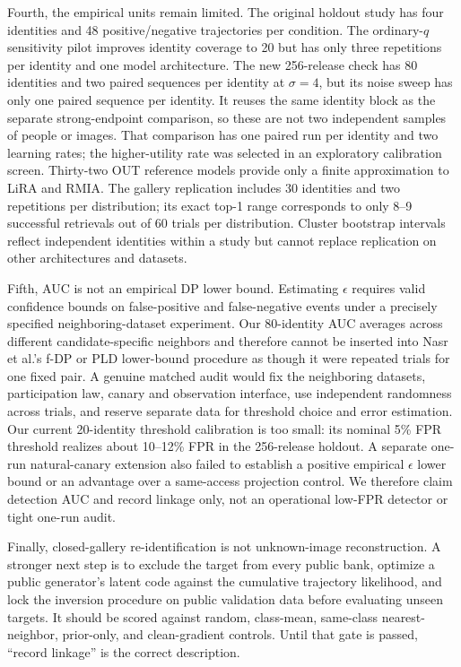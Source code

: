 \documentclass[conference]{IEEEtran}
\begin{document}
Fourth, the empirical units remain limited. The original holdout study has four identities and 48 positive/negative trajectories per condition. The ordinary-$q$ sensitivity pilot improves identity coverage to 20 but has only three repetitions per identity and one model architecture. The new 256-release check has 80 identities and two paired sequences per identity at $\sigma=4$, but its noise sweep has only one paired sequence per identity. It reuses the same identity block as the separate strong-endpoint comparison, so these are not two independent samples of people or images. That comparison has one paired run per identity and two learning rates; the higher-utility rate was selected in an exploratory calibration screen. Thirty-two OUT reference models provide only a finite approximation to LiRA and RMIA. The gallery replication includes 30 identities and two repetitions per distribution; its exact top-1 range corresponds to only 8--9 successful retrievals out of 60 trials per distribution. Cluster bootstrap intervals reflect independent identities within a study but cannot replace replication on other architectures and datasets.

Fifth, AUC is not an empirical DP lower bound. Estimating $\epsilon$ requires valid confidence bounds on false-positive and false-negative events under a precisely specified neighboring-dataset experiment. Our 80-identity AUC averages across different candidate-specific neighbors and therefore cannot be inserted into Nasr et al.'s f-DP or PLD lower-bound procedure as though it were repeated trials for one fixed pair. A genuine matched audit would fix the neighboring datasets, participation law, canary and observation interface, use independent randomness across trials, and reserve separate data for threshold choice and error estimation. Our current 20-identity threshold calibration is too small: its nominal 5\% FPR threshold realizes about 10--12\% FPR in the 256-release holdout. A separate one-run natural-canary extension also failed to establish a positive empirical $\epsilon$ lower bound or an advantage over a same-access projection control. We therefore claim detection AUC and record linkage only, not an operational low-FPR detector or tight one-run audit.

Finally, closed-gallery re-identification is not unknown-image reconstruction. A stronger next step is to exclude the target from every public bank, optimize a public generator's latent code against the cumulative trajectory likelihood, and lock the inversion procedure on public validation data before evaluating unseen targets. It should be scored against random, class-mean, same-class nearest-neighbor, prior-only, and clean-gradient controls. Until that gate is passed, ``record linkage'' is the correct description.
\end{document}
